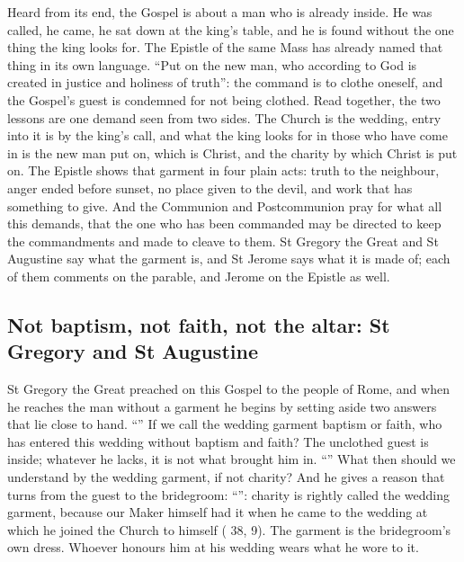 \label{sec:wedding-garment}

Heard from its end, the Gospel is about a man who is already inside. He was
called, he came, he sat down at the king's table, and he is found without the
one thing the king looks for. The Epistle of the same Mass has already named
that thing in its own language. ``Put on the new man, who according to God is
created in justice and holiness of truth'': the command is to clothe oneself,
and the Gospel's guest is condemned for not being clothed. Read together, the
two lessons are one demand seen from two sides. The Church is the wedding,
entry into it is by the king's call, and what the king looks for in those who
have come in is the new man put on, which is Christ, and the charity by which
Christ is put on. The Epistle shows that garment in four plain acts: truth to
the neighbour, anger ended before sunset, no place given to the devil, and work
that has something to give. And the Communion and Postcommunion pray for what
all this demands, that the one who has been commanded may be directed to keep
the commandments and made to cleave to them. St Gregory the Great and St
Augustine say what the garment is, and St Jerome says what it is made of; each
of them comments on the parable, and Jerome on the Epistle as well.

\subsection{Not baptism, not faith, not the altar: St Gregory and St Augustine}

St Gregory the Great preached on this Gospel to the people of Rome, and when he
reaches the man without a garment he begins by setting aside two answers that
lie close to hand. ``'' If we call the wedding
garment baptism or faith, who has entered this wedding without baptism and
faith? The unclothed guest is inside; whatever he lacks, it is not what brought
him in. ``'' What then should we understand by the wedding garment, if not
charity? And he gives a reason that turns from the guest to the bridegroom:
``'': charity is
rightly called the wedding garment, because our Maker himself had it when he
came to the wedding at which he joined the Church to himself ( 38, 9). The garment is the bridegroom's own dress. Whoever honours
him at his wedding wears what he wore to it.

